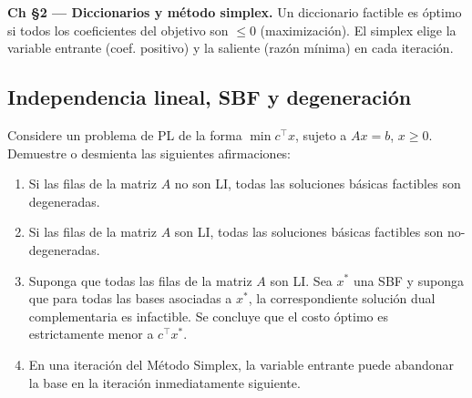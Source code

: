 \documentclass[12pt]{article}
\theoremstyle{plain}
\begin{document}
\begin{teofund}
\textbf{Ch §2 — Diccionarios y método simplex.} Un diccionario factible es óptimo si todos los coeficientes del objetivo son $\leq 0$ (maximización). El simplex elige la variable entrante (coef. positivo) y la saliente (razón mínima) en cada iteración.
\end{teofund}

\bigskip

\subsection{Independencia lineal, SBF y degeneración}

Considere un problema de PL de la forma $\min c^\top x$, sujeto a $Ax = b$, $x \geq 0$.
Demuestre o desmienta las siguientes afirmaciones:

\begin{enumerate}[label=\alph*)]
      \item Si las filas de la matriz $A$ no son LI, todas las soluciones básicas factibles
            son degeneradas.

      \item Si las filas de la matriz $A$ son LI, todas las soluciones básicas factibles
            son no-degeneradas.

      \item Suponga que todas las filas de la matriz $A$ son LI. Sea $x^*$ una SBF y
            suponga que para todas las bases asociadas a $x^*$, la correspondiente solución
            dual complementaria es infactible. Se concluye que el costo óptimo es
            estrictamente menor a $c^\top x^*$.

      \item En una iteración del Método Simplex, la variable entrante puede abandonar la
            base en la iteración inmediatamente siguiente.
\end{enumerate}
\end{document}
